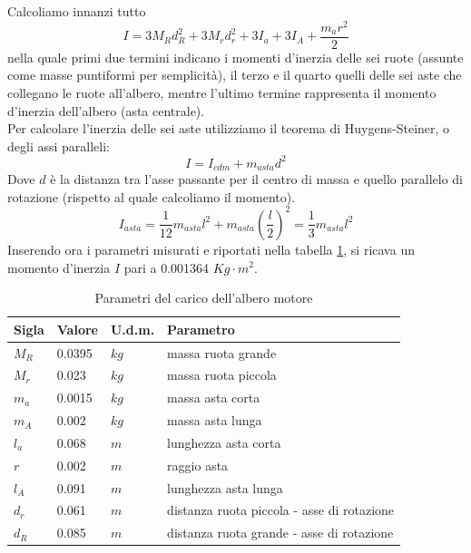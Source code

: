 Calcoliamo innanzi tutto 
$$
I=3M_Rd_R^2+3M_rd_r^2+3I_a+3I_A+\displaystyle\frac{m_ar^2}{2}
$$
nella quale primi due termini indicano i momenti d'inerzia delle sei ruote (assunte come masse puntiformi per semplicità), il terzo e il quarto quelli delle sei aste che collegano le ruote all'albero, mentre l'ultimo termine rappresenta il momento d'inerzia dell'albero (asta centrale).\\
Per calcolare l'inerzia delle sei aste utilizziamo il teorema di Huygens-Steiner, o degli assi paralleli:
$$
I=I_{cdm}+m_{asta}d^2
$$
Dove $d$ è la distanza tra l'asse passante per il centro di massa e quello parallelo di rotazione (rispetto al quale calcoliamo il momento).\\
$$
I_{asta}=\displaystyle\frac{1}{12}m_{asta}l^2+m_{asta}(\displaystyle\frac{l}{2})^2=\displaystyle\frac{1}{3}m_{asta}l^2
$$
Inserendo ora i parametri misurati  e riportati nella tabella \ref{Inerzia}, si ricava un momento d'inerzia $I$ pari a 0.001364 $Kg\cdot m^2$.
\begin{table}[ht]
	\begin{tabular}{|l|l|l|l|}
		\hline
		\textbf{Sigla} & \textbf{Valore} & \textbf{U.d.m.} & \textbf{Parametro}\\
		\hline
		$M_R$ & 0.0395 & $kg$ & massa ruota grande\\
		\hline
		$M_r$ & 0.023 & $kg$ & massa ruota piccola\\
		\hline
		$m_a$ & 0.0015 & $kg$ & massa asta corta\\	
		\hline
		$m_A$ & 0.002 & $kg$ & massa asta lunga\\	
		\hline
		$l_a$ & 0.068 & $m$ & lunghezza asta corta\\
		\hline
		$r$ & 0.002 & $m$ & raggio asta\\
		\hline
		$l_A$ & 0.091 & $m$ & lunghezza asta lunga\\
		\hline
		$d_r$ & 0.061 & $m$ & distanza ruota piccola - asse di rotazione\\
		\hline
		$d_R$ & 0.085 & $m$  & distanza ruota grande - asse di rotazione\\
		\hline
	\end{tabular}
\caption{Parametri del carico dell'albero motore}
\label{Inerzia}
\end{table}

